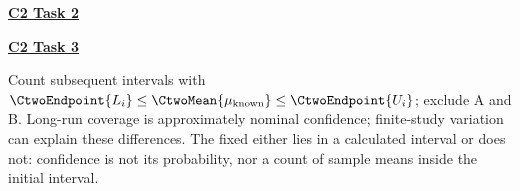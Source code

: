 \par\textbf{\hyperref[sol:p3c2b]{C2 Task 2}}\par
{}

\par\textbf{\hyperref[sol:p3c2c]{C2 Task 3}}\par
{}
Count subsequent intervals with $\CtwoEndpoint{L_i}\le \CtwoMean{\mu_{\mathrm{known}}}\le \CtwoEndpoint{U_i}$; exclude A and B.
Long-run coverage is approximately nominal confidence; finite-study variation can explain these differences. The fixed  either lies in a calculated interval or does not: confidence is not its probability, nor a count of sample means inside the initial interval.
\secInicio[][sec:p3]


